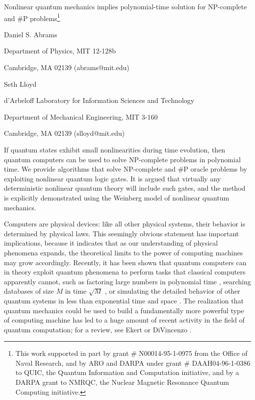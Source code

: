 \documentclass[12pt]{article}
\begin{document}
\begin{center}
{\Large Nonlinear quantum mechanics implies polynomial-time solution for
NP-complete and \#P problems}\footnote{This work supported in part by grant \#
N00014-95-1-0975 from the Office of Naval Research, and by ARO and DARPA under
grant \# DAAH04-96-1-0386 to QUIC, the Quantum Information and Computation
initiative, and by a DARPA grant to NMRQC, the Nuclear Magnetic Resonance
Quantum Computing initiative.}

\bigskip\medskip

Daniel S. Abrams

Department of Physics, MIT 12-128b

Cambridge, MA 02139 (abrams@mit.edu)

\medskip\medskip

Seth Lloyd

d'Arbeloff Laboratory for Information Sciences and Technology

Department of Mechanical Engineering, MIT 3-160

Cambridge, MA 02139 (slloyd@mit.edu)

\medskip\medskip
\end{center}

If quantum states exhibit small nonlinearities during time evolution, then
quantum computers can be used to solve NP-complete problems in polynomial
time. We provide algorithms that solve NP-complete and \#P oracle problems by
exploiting nonlinear quantum logic gates. It is argued that virtually any
deterministic nonlinear quantum theory will include such gates, and the method
is explicitly demonstrated using the Weinberg model of nonlinear quantum
mechanics.\bigskip\bigskip\bigskip\pagebreak 

Computers are physical devices: like all other physical systems, their
behavior is determined by physical laws. This seemingly obvious statement has
important implications, because it indicates that as our understanding of
physical phenomena expands, the theoretical limits to the power of computing
machines may grow accordingly. Recently, it has been shown that quantum
computers can in theory exploit quantum phenomena to perform tasks that
classical computers apparently cannot, such as factoring large numbers in
polynomial time \cite{Shor}, searching databases of size $M$ in time $\sqrt{M}$
\cite{Grover}, or simulating the detailed behavior of other quantum systems in
less than exponential time and space \cite{Feynman,Lloyd,Abrams}.
The realization that quantum mechanics could be used to build a fundamentally
more powerful type of computing machine has led to a huge amount of recent
activity in the field of quantum computation; for a review, see
Ekert \cite{Ekert} or DiVincenzo \cite{DiVincenzo}.
\end{document}
